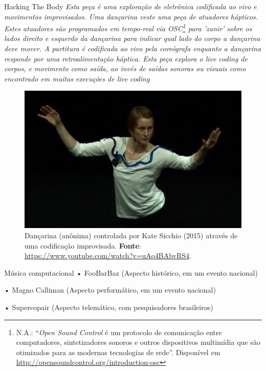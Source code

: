 \documentclass[aspectratio=169]{beamer}
\begin{document}
\begin{frame}[allowframebreaks]{Hacking The Body}
\emph{Esta peça é uma exploração de eletrônica codificada ao vivo e movimentos improvisados. Uma dançarina veste uma peça de atuadores hápticos. Estes atuadores são programados em tempo-real via OSC\footnote{N.A.: ``\emph{Open Sound Control} é um protocolo de comunicação entre computadores, sintetizadores sonoros e outros dispositivos multimídia que são otimizados para as modernas tecnologias de rede''. Disponível em \url{http://opensoundcontrol.org/introduction-osc}} para 'zunir' sobre os lados direito e esquerdo da dançarina para indicar qual lado do corpo a dançarina deve mover. A partitura é codificada ao vivo pela coreógrafa enquanto a dançarina responde por uma retroalimentação háptica. Esta peça explora o \emph{live coding} de corpos, e movimento como saída, ao invés de saídas sonoras ou visuais como encontrado em muitas execuções de \emph{live coding}
}

\begin{figure}[!h]
  \centering
  \includegraphics[scale=0.3]{imagens/iclcdanca.png}
  \caption{Dançarina (anônima) controlada por Kate Sicchio (2015) através de uma codificação improvisada. \textbf{Fonte}: \url{https://www.youtube.com/watch?v=uAq4BAbvRS4}.}
  \label{fig:iclcdanca}
\end{figure}
\end{frame}

\begin{frame}{Música computacional}
• FooBarBaz      (Aspecto histórico, em um evento nacional)

• Magno Calliman (Aspecto performático, em um evento nacional)

• Supercopair    (Aspecto telemático, com pesquisadores brasileiros)
\end{frame}
\end{document}

